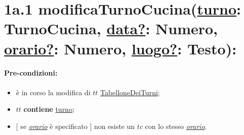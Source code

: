 \section*{1a.1 modificaTurnoCucina(\underline{turno}: TurnoCucina, \underline{data?}: Numero, \underline{orario?}: Numero, \underline{luogo?}: Testo):}

\paragraph{Pre-condizioni:}

\begin{itemize}
 \item è in corso la modifica di $tt$ \underline{TabelloneDeiTurni};
 \item $tt$ \textbf{contiene} \underline{turno};
 \item $[$ se \underline{\textit{orario}} è specificato $]$ non esiste un $tc$ con lo stesso \underline{\textit{orario}}.
\end{itemize}

